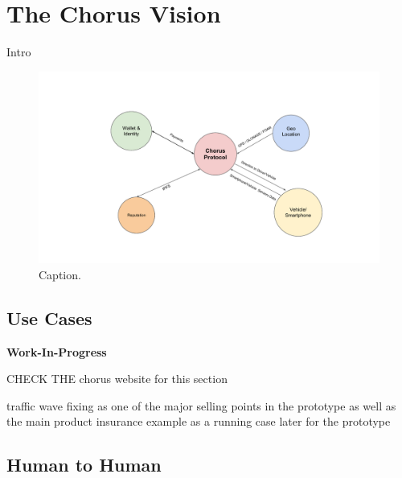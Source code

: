 \documentclass{llncs}
\begin{document}
{	%

	\section{The Chorus Vision}
		\label{s:section-3}
		
		
		Intro

		
				\begin{figure}[H]
					\centering
					\includegraphics[scale=0.4]{Figures/20180503_Will-Chorus-Architecture-Draft.pdf}
					\caption{Caption.}	
					\label{fig:dummy-architecture}
				\end{figure}					

		
		\subsection{Use Cases}
			\label{ss:use-cases}

			\textbf{Work-In-Progress}
			
			CHECK THE chorus website for this section
			
			traffic wave fixing as one of the major selling points in the prototype as well as the main product
			insurance example as a running case later for the prototype
			
			
			
		\subsection{Human to Human}

}
\end{document}
